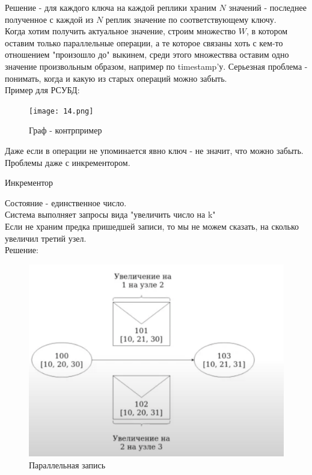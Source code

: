         Решение - для каждого ключа на каждой реплики храним $N$ значений - последнее полученное с каждой из $N$ реплик значение по соответствующему ключу. \\
        Когда хотим получить актуальное значение, строим множество $W$, в котором оставим только параллельные операции, а те которое связаны хоть с кем-то отношением "произошло до" выкинем, среди этого множествва оставим одно значение произвольным образом, например по timestamp'у.
    Серьезная проблема - понимать, когда и какую из старых операций можно забыть.\\
    Пример для РСУБД:\\
    \begin{figure}[h]
        \centering
        \texttt{[image: 14.png]}
        \caption{Граф - контрпример}
    \end{figure}
    Даже если в операции не упоминается явно ключ - не значит, что можно забыть.\\
    Проблемы даже с инкрементором.\\
    \begin{definition}
    Инкрементор
    \end{definition}
      Состояние - единственное число.\\
      Система выполняет запросы вида "увеличить число на k"\\
      Если не храним предка пришедшей записи, то мы не можем сказать, на сколько увеличил третий узел.\\
      Решение:\\
      \begin{figure}[h]
          \centering
          \includegraphics[scale = 0.5]{../assets/15.png}
          \caption{Параллельная запись}
      \end{figure}
